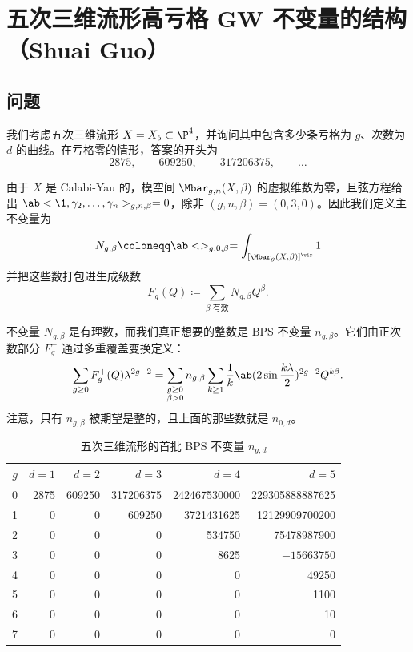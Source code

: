 \section{五次三维流形高亏格 GW 不变量的结构（Shuai Guo）}%
\label{sec:Structure of higher-genus GW invariants of the quintic (Shuai Guo)}

\subsection{问题}%
\label{sub:The problem (Guo)}

我们考虑五次三维流形 \(X = X_5 \subset \P^4\)，并询问其中包含多少条亏格为 \(g\)、次数为 \(d\) 的曲线。在亏格零的情形，答案的开头为
\[ 2875, \qquad 609250, \qquad 317206375, \qquad \ldots \]

由于 \(X\) 是 Calabi-Yau 的，模空间 \(\Mbar_{g,n}(X,\beta)\) 的虚拟维数为零，且弦方程给出 \(\ab<\1, \gamma_2, \ldots, \gamma_n>_{g,n,\beta} = 0\)，除非 \((g,n,\beta) = (0,3,0)\)。因此我们定义主不变量为
\[ N_{g,\beta} \coloneqq \ab<>_{g,0,\beta} = \int_{[\Mbar_g(X,\beta)]^{\vir}} 1 \]
并把这些数打包进生成级数
\[ F_g(Q) \coloneqq \sum_{\beta \text{ 有效}} N_{g,\beta}Q^{\beta}. \]

不变量 \(N_{g,\beta}\) 是有理数，而我们真正想要的整数是 BPS 不变量 \(n_{g,\beta}\)。它们由正次数部分 \(F_g^+\) 通过多重覆盖变换定义：
\[ \sum_{g \geq 0} F_g^+(Q)\lambda^{2g-2} = \sum_{\substack{g \geq 0 \\ \beta > 0}} n_{g,\beta} \sum_{k \geq 1} \frac{1}{k} \ab(2 \sin \frac{k\lambda}{2})^{2g-2}Q^{k\beta}. \]
注意，只有 \(n_{g,\beta}\) 被期望是整的，且上面的那些数就是 \(n_{0,d}\)。

\begin{table}[htpb]
    \centering
    \caption{五次三维流形的首批 BPS 不变量 \(n_{g,d}\)}
    \label{tab:quinticbps}
    \begin{tabular}{crrrrr}
        \toprule
        \(g\) & \(d=1\) & \(d=2\) & \(d=3\) & \(d=4\) & \(d=5\) \\
        \midrule
        0 & 2875 & 609250 & 317206375 & 242467530000 & 229305888887625 \\
        1 & 0 & 0 & 609250 & 3721431625 & 12129909700200 \\
        2 & 0 & 0 & 0 & 534750 & 75478987900 \\
        3 & 0 & 0 & 0 & 8625 & \(-15663750\) \\
        4 & 0 & 0 & 0 & 0 & 49250 \\
        5 & 0 & 0 & 0 & 0 & 1100 \\
        6 & 0 & 0 & 0 & 0 & 10 \\
        7 & 0 & 0 & 0 & 0 & 0 \\
        \bottomrule
    \end{tabular}
\end{table}

